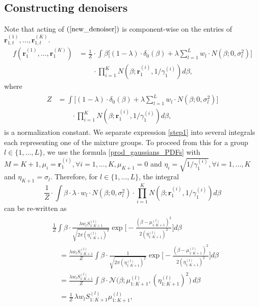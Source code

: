 \subsection*{Constructing denoisers}
Note that acting of $(\ref{new_denoiser})$ is component-wise on the entries of $\bm{r}_{1,t}^{(1)}, \dots,\allowbreak \bm{r}_{1,t}^{(K)}$. %
\begin{equation}
    \label{step1}
    \begin{split}
    f(\textbf{r}_1^{(1)}, \dots, \textbf{r}_1^{(K)}) & = \frac{1}{Z} \cdot \int \beta \bigg [(1-\lambda) \cdot \delta_0(\beta) + \lambda \sum_{l=1}^L w_l \cdot N(\beta; 0, \sigma_l^2) \bigg ] \\
    & \qquad \cdot \prod_{i=1}^K N(\beta; \textbf{r}_1^{(i)}, 1/\gamma_{1}^{(i)} ) d \beta,
    \end{split}
\end{equation}
where 
\begin{align}
    \begin{split}
    Z & = \int \bigg [(1-\lambda) \cdot \delta_0(\beta) + \lambda \sum_{l=1}^L w_l \cdot N(\beta; 0, \sigma_l^2) \bigg ] \\
    & \qquad \cdot \prod_{i=1}^K N(\beta; \textbf{r}_1^{(i)}, 1/\gamma_{1}^{(i)} ) d \beta,
    \end{split}
\end{align}
is a normalization constant. We separate expression \eqref{step1} into several integrals each representing one of the mixture groups. To proceed from this for a group $l \in \{1, \dots, L\}$, we use the formula \eqref{prod_gaussians_PDFs} with $M=K+1, \mu_i = \textbf{r}_1^{(i)}, \forall i=1,\dots, K, \mu_{K+1} = 0$ and $\eta_i = \sqrt{1/\gamma_1^{(i)}}, \forall i=1, \dots, K$ and $\eta_{K+1} = \sigma_l$. Therefore, for $l \in \{1,\dots, L\}$, the integral 
\begin{equation}
    \frac{1}{Z} \cdot \int \beta \cdot \lambda \cdot  w_l \cdot N(\beta; 0, \sigma_l^2) \cdot \prod_{i=1}^K N(\beta; \textbf{r}_1^{(i)}, 1/\gamma_{1}^{(i)} ) d \beta
\end{equation}
can be re-written as 
\begin{align}
    \label{rewritting_expe_l}
    \begin{split}
    & \frac{1}{Z} \int \beta \cdot \frac{\lambda w_l S_{1:K+1}^{(l)}}{\sqrt{2 \pi (\eta_{1:K+1}^{(l)})^2}} \exp \bigg [ -\frac{(\beta - \mu_{1:K+1}^{(l)})^2}{2 (\eta_{1:K+1}^{(l)})^2} \bigg ] d \beta \\
    & \quad = \frac{\lambda w_l S_{1:K+1}^{(l)}}{Z} \int \beta \cdot \frac{1}{\sqrt{2 \pi (\eta_{1:K+1}^{(l)})^2}} \exp \bigg [ -\frac{(\beta - \mu_{1:K+1}^{(l)})^2}{2 (\eta_{1:K+1}^{(l)})^2} \bigg ] d \beta \\
    & \quad = \frac{\lambda w_l S_{1:K+1}^{(l)}}{Z} \int \beta \cdot \mathcal{N} \big( \beta; \mu_{1:K+1}^{(l)}, (\eta_{1:K+1}^{(l)})^2 \big) \, d \beta \\
    & \quad = \frac{1}{Z} \, \lambda w_l S_{1:K+1}^{(l)} \mu_{1:K+1}^{(l)},
    \end{split}
\end{align}

